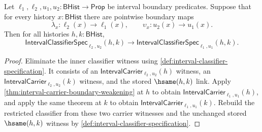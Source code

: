 \begin{theorem}
\label{thm:interval-classifier-boundary-weakening}
Let \(\ell_1,\ell_2,u_1,u_2:\mathsf{BHist}\to\mathsf{Prop}\) be interval boundary predicates. Suppose that for every history \(x:\mathsf{BHist}\) there are pointwise boundary maps
$$
\lambda_x:\ell_2(x)\to\ell_1(x),
\qquad
\upsilon_x:u_2(x)\to u_1(x).
$$
Then for all histories \(h,k:\mathsf{BHist}\),
$$
\mathsf{IntervalClassifierSpec}_{\ell_2,u_2}(h,k)\to
\mathsf{IntervalClassifierSpec}_{\ell_1,u_1}(h,k).
$$
\end{theorem}
\begin{proof}
Eliminate the inner classifier witness using \autoref{def:interval-classifier-specification}. It consists of an \(\mathsf{IntervalCarrier}_{\ell_2,u_2}(h)\) witness, an \(\mathsf{IntervalCarrier}_{\ell_2,u_2}(k)\) witness, and the stored \(\hsame(h,k)\) link. Apply \autoref{thm:interval-carrier-boundary-weakening} at \(h\) to obtain \(\mathsf{IntervalCarrier}_{\ell_1,u_1}(h)\), and apply the same theorem at \(k\) to obtain \(\mathsf{IntervalCarrier}_{\ell_1,u_1}(k)\). Rebuild the restricted classifier from these two carrier witnesses and the unchanged stored \(\hsame(h,k)\) witness by \autoref{def:interval-classifier-specification}.
\end{proof}

